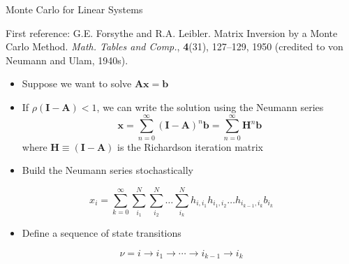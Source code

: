 \documentclass{beamer}
\begin{document}
\begin{frame}{Monte Carlo for Linear Systems}

  First reference: G.E. Forsythe and R.A. Leibler. Matrix Inversion by
    a Monte Carlo Method. \textit{Math. Tables and Comp.}, {\bf 4}(31),
    127--129, 1950 (credited to von Neumann and Ulam, 1940s).
  \begin{itemize}
    \item Suppose we want to solve $\mathbf{Ax}=\mathbf{b}$
    \vfill
    \item If $\rho(\mathbf{I-A})<1$, we can write the solution using the
      Neumann series
      \begin{equation*}
        \mathbf{x} = \sum_{n=0}^{\infty} (\mathbf{I-A})^n \mathbf{b}
         = \sum_{n=0}^{\infty} \mathbf{H}^n \mathbf{b}
      \end{equation*}
      where $\mathbf{H} \equiv ( \mathbf{I-A} )$ is the Richardson
      iteration matrix
      \vfill
    \item Build the Neumann series stochastically
  \end{itemize}

  \[
  x_i = \sum_{k=0}^{\infty}\sum_{i_1}^{N}\sum_{i_2}^{N}\ldots
  \sum_{i_k}^{N}h_{i,i_1}h_{i_1,i_2}\ldots h_{i_{k-1},i_k}b_{i_k}
  \]

  \begin{itemize}
  \item Define a sequence of state transitions
  \end{itemize}
  \[
  \nu = i \rightarrow i_1 \rightarrow \cdots \rightarrow i_{k-1}
  \rightarrow i_{k}
  \]

\end{frame}

\end{document}
